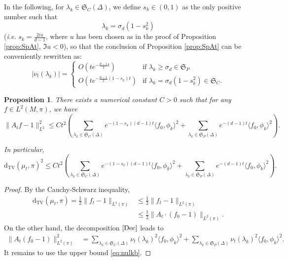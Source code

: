 \documentclass[]{scrartcl}
\newcommand{\DTV}{\mathrm{d_{TV}}}
\newtheorem{proposition}[theorem]{Proposition}
\numberwithin{equation}{section}
\numberwithin{figure}{section}
\begin{document}
In the following, for $\lambda_k \in \mathfrak S_C(\Delta)$, we define $s_k\in (0,1)$ as the only positive number such that $$\lambda_k = \sigma_d (1 -s^2_k)$$ (\textit{i.e.} $s_k  = \frac{2 iu}{d-1}$, where $u$ has been chosen as in the proof of Proposition \ref{prop:SpAt}, $\Im u < 0$), so that the conclusion of Proposition \ref{prop:SpAt} can be conveniently rewritten as:
\begin{equation} \label{eq:nulkb}
	|\nu_t(\lambda_k)| = \begin{cases}  O\left(t e^{-\frac{d-1}{2} t}\right)&\text{if $\lambda_k  \geq \sigma_d \in \mathfrak S_P $}\\O\left( t e^{-\frac{d-1}{2} (1 - s_k) t }\right)&\text{if $\lambda_k = \sigma_d ( 1 -s_{k}^2) \in \mathfrak S_C$}.\end{cases}
\end{equation}


\begin{proposition}{}\label{prop:MajL2}
	There exists a numerical constant $C >0$ such that for any $f \in L^2(M, \pi)$, we have \[\lVert A_t f-1\rVert_{L^2}^2 \leq C t ^2 \left(\sum_{\lambda_k \in \mathfrak S_C(\Delta)} e^{-(1-s_k)(d-1)t}\langle f_0, \phi_k \rangle^2 + \sum_{\lambda_k \in \mathfrak S_P(\Delta)} e^{-(d-1)t}\langle f_0, \phi_k \rangle^2 \right).         \]
	
	In particular, \[\DTV\left( \mu_t,\pi \right)^2 \leq C t^2 \left(\sum_{\lambda_k \in \mathfrak S_C(\Delta)} e^{-(1-s_k)(d-1)t}\langle f_0, \phi_k \rangle^2 + \sum_{\lambda_k \in \mathfrak S_P(\Delta)} e^{-(d-1)t}\langle f_0, \phi_k \rangle^2\right) .\]
\end{proposition} 
\begin{proof}
	
	By the Cauchy-Schwarz inequality,
	\begin{align*}
		\DTV\left( \mu_t,\pi \right) = \frac{1}{2}\lVert f_t - 1\rVert_{L^1(\pi)} &\leq \frac{1}{2} \lVert f_t-1\rVert_{L^2(\pi)}
		\\&\leq \frac{1}{2} \lVert A_t \cdot \left(f_0-1\right)\rVert_{L^2(\pi)}.
	\end{align*}
	On the other hand, the decomposition $\eqref{Dec}$ leads to
	\begin{align*}\lVert A_t\left(f_0-1\right) \rVert_{L^2(\pi)}^2 &=  \sum_{\lambda_k \in \mathfrak S_C(\Delta)} \nu_t(\lambda_k)^2\langle f_0, \phi_k \rangle^2 + \sum_{\lambda_k \in \mathfrak S_P(\Delta)} \nu_t(\lambda_k)^2\langle f_0, \phi_k \rangle^2 .
	\end{align*}
	It remains to use the upper bound \eqref{eq:nulkb}.
\end{proof}
\end{document}
